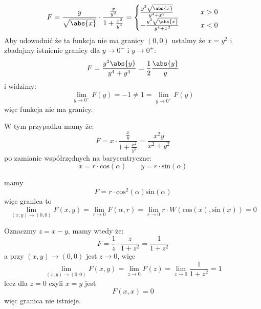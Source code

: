 \documentclass[11pt]{scrartcl}
\begin{document}
        \begin{walk}
            \item 
              \[
                F = \frac{y}{\sqrt{\abs{x}}} \cdot \frac{\frac{x}{y^2}}{1 + \frac{x^2}{y^4}} = \begin{cases} \frac{y^3 \sqrt{\abs{x} } }{y^4 + x^2} \qquad &x > 0 \\
                  - \frac{y^3 \sqrt{\abs{x} } }{y^4 + x^2} \qquad &x < 0
                \end{cases}
              \]
            Aby udowodnić że ta funkcja nie ma granicy $(0,0)$ ustalmy że $x = y^2$ i zbadajmy istnienie granicy dla $y \to 0^-$ i $y \to 0^+$:
            \[
                F = \frac{y^3 \abs{y} }{y^4 + y^4} = \frac{1}{2} \frac{\abs{y} }{y}
            \]
            i widzimy:
            \[
                \lim_{y \to 0^-} F(y) = -1 \not = 1 = \lim_{y \to 0^+} F(y)    
            \]
            więc funkcja nie ma granicy.
            \item 
              W tym przypadku mamy że:
              \[
                  F = x \cdot \frac{\frac{x}{y}}{1 + \frac{x^2}{y^2}} = \frac{x^2 y}{x^2 + y^2} 
              \]
              po zamianie współrzędnych na barycentryczne:
              \[
                  x = r \cdot \text{cos} \left ( \alpha  \right ) \qquad y = r \cdot \text{sin} \left ( \alpha  \right ) 
              \]
              
              mamy
              \[
                  F = r \cdot \text{cos}^2 \left ( \alpha  \right ) \text{sin} \left ( \alpha  \right )  
              \]
              więc granica to
              \[
              \lim_{(x,y) \to (0,0)} F(x,y) = \lim_{r \to 0} F(\alpha , r) = \lim_{r \to 0} r \cdot W(\text{cos} \left ( x \right ), \text{sin} \left ( x \right )  ) = 0     
              \]

          \item 
            Oznaczmy $z = x - y$, mamy wtedy że:
            \[
                F = \frac{1}{z} \cdot \frac{z}{1 + z^2} = \frac{1}{1 + z^2}
            \]
            a przy $(x,y) \to (0,0)$ jest $z \to 0$, więc 
            \[
                \lim_{(x,y) \to (0,0)} F(x,y) = \lim_{z \to 0} F(z) = \lim_{z \to 0} \frac{1}{1 + z^2} = 1   
            \]
            lecz dla $z = 0$ czyli $x = y$ jest
            \[
                F(x,x) = 0
            \]
            więc granica nie istnieje.
        \end{walk}
        
\end{document}
